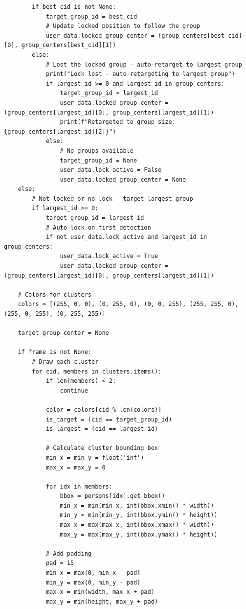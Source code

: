 \documentclass[11pt,a4paper]{article}
\begin{document}
\begin{lstlisting}
        if best_cid is not None:
            target_group_id = best_cid
            # Update locked position to follow the group
            user_data.locked_group_center = (group_centers[best_cid][0], group_centers[best_cid][1])
        else:
            # Lost the locked group - auto-retarget to largest group
            print("Lock lost - auto-retargeting to largest group")
            if largest_id >= 0 and largest_id in group_centers:
                target_group_id = largest_id
                user_data.locked_group_center = (group_centers[largest_id][0], group_centers[largest_id][1])
                print(f"Retargeted to group size: {group_centers[largest_id][2]}")
            else:
                # No groups available
                target_group_id = None
                user_data.lock_active = False
                user_data.locked_group_center = None
    else:
        # Not locked or no lock - target largest group
        if largest_id >= 0:
            target_group_id = largest_id
            # Auto-lock on first detection
            if not user_data.lock_active and largest_id in group_centers:
                user_data.lock_active = True
                user_data.locked_group_center = (group_centers[largest_id][0], group_centers[largest_id][1])
    
    # Colors for clusters
    colors = [(255, 0, 0), (0, 255, 0), (0, 0, 255), (255, 255, 0), (255, 0, 255), (0, 255, 255)]
    
    target_group_center = None
    
    if frame is not None:
        # Draw each cluster
        for cid, members in clusters.items():
            if len(members) < 2:
                continue
            
            color = colors[cid % len(colors)]
            is_target = (cid == target_group_id)
            is_largest = (cid == largest_id)
            
            # Calculate cluster bounding box
            min_x = min_y = float('inf')
            max_x = max_y = 0
            
            for idx in members:
                bbox = persons[idx].get_bbox()
                min_x = min(min_x, int(bbox.xmin() * width))
                min_y = min(min_y, int(bbox.ymin() * height))
                max_x = max(max_x, int(bbox.xmax() * width))
                max_y = max(max_y, int(bbox.ymax() * height))
            
            # Add padding
            pad = 15
            min_x = max(0, min_x - pad)
            min_y = max(0, min_y - pad)
            max_x = min(width, max_x + pad)
            max_y = min(height, max_y + pad)
            

\end{lstlisting}
\end{document}
